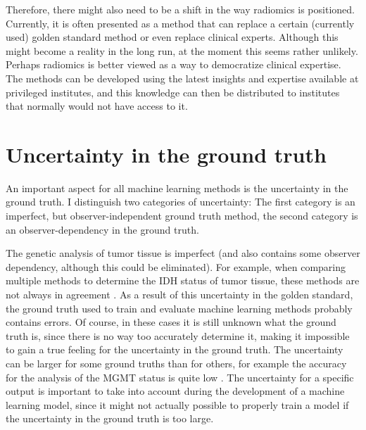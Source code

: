 Therefore, there might also need to be a shift in the way radiomics is positioned.
Currently, it is often presented as a method that can replace a certain (currently used) golden standard method or even replace clinical experts.
Although this might become a reality in the long run, at the moment this seems rather unlikely.
Perhaps radiomics is better viewed as a way to democratize clinical expertise.
The methods can be developed using the latest insights and expertise available at privileged institutes, and this knowledge can then be distributed to institutes that normally would not have access to it.


\section{Uncertainty in the ground truth}

An important aspect for all machine learning methods is the uncertainty in the ground truth.
I distinguish two categories of uncertainty: The first category is an imperfect, but observer-independent ground truth method, the second category is an observer-dependency in the ground truth.

The genetic analysis of tumor tissue is imperfect (and also contains some observer dependency, although this could be eliminated).
For example, when comparing multiple methods to determine the \gls{IDH} status of \gls{tumor} tissue, these methods are not always in agreement \autocite{pyo2016concordance}.
As a result of this uncertainty in the golden standard, the ground truth used to train and evaluate machine learning methods probably contains errors.
Of course, in these cases it is still unknown what the  ground truth is, since there is no way too  accurately determine it, making it impossible to gain a true feeling for the uncertainty in the ground truth.
The uncertainty can be larger for some ground truths than for others, for example the accuracy for the analysis of the \gls{MGMT} status is quite low \autocite{wang2017mgmt}.
The uncertainty for a specific output is important to take into account during the development of a machine learning model, since it might not actually possible to properly train a model if the uncertainty in the ground truth is too large.

